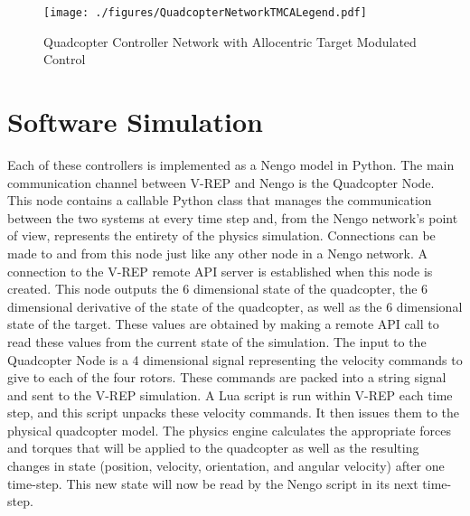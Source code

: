 \documentclass[letterpaper,12pt,titlepage,oneside,final]{book}
\begin{document}
\begin{figure}
\centering
\texttt{[image: ./figures/QuadcopterNetworkTMCALegend.pdf]} %
\caption{Quadcopter Controller Network with Allocentric Target Modulated Control}
\label{fig:NetTMCA}
\end{figure}

\section{Software Simulation}


Each of these controllers is implemented as a Nengo model in Python. 
The main communication channel between V-REP and Nengo is the Quadcopter Node. 
This node contains a callable Python class that manages the communication between the two systems at every time step and, from the Nengo network's point of view, represents the entirety of the physics simulation. 
Connections can be made to and from this node just like any other node in a Nengo network. 
A connection to the V-REP remote API server is established when this node is created. 
This node outputs the 6 dimensional state of the quadcopter, the 6 dimensional derivative of the state of the quadcopter, as well as the 6 dimensional state of the target. 
These values are obtained by making a remote API call to read these values from the current state of the simulation. The input to the Quadcopter Node is a 4 dimensional signal representing the velocity commands to give to each of the four rotors. 
These commands are packed into a string signal and sent to the V-REP simulation. 
A Lua script is run within V-REP each time step, and this script unpacks these velocity commands. 
It then issues them to the physical quadcopter model. The physics engine calculates the appropriate forces and torques that will be applied to the quadcopter as well as the resulting changes in state (position, velocity, orientation, and angular velocity) after one time-step. 
This new state will now be read by the Nengo script in its next time-step.
\end{document}
